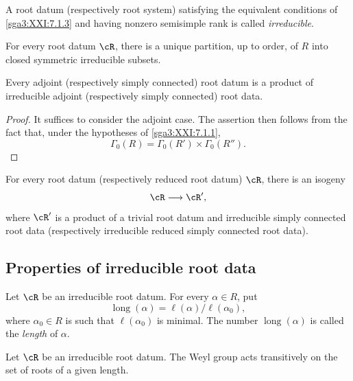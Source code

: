 \begin{definition}\label{sga3:XXI:7.1.4}
A root datum (respectively root system) satisfying the equivalent
conditions of \ref{sga3:XXI:7.1.3} and having nonzero semisimple
rank is called \emph{irreducible}.
\end{definition}

\begin{corollary}\label{sga3:XXI:7.1.5}
For every root datum \(\cR\), there is a unique partition, up to
order, of \(R\) into closed symmetric irreducible subsets.
\end{corollary}

\begin{corollary}\label{sga3:XXI:7.1.6}
Every adjoint (respectively simply connected) root datum is a
product of irreducible adjoint (respectively simply connected) root
data.
\end{corollary}

\begin{proof}
It suffices to consider the adjoint case. The assertion then follows
from the fact that, under the hypotheses of
\ref{sga3:XXI:7.1.1},
\[
 \Gamma_0(R)=\Gamma_0(R')\times\Gamma_0(R'').
\]
\end{proof}

\begin{corollary}\label{sga3:XXI:7.1.7}
For every root datum (respectively reduced root datum) \(\cR\),
there is an isogeny
\[
 \cR\longrightarrow\cR',
\]
where \(\cR'\) is a product of a trivial root datum and irreducible
simply connected root data (respectively irreducible reduced simply
connected root data).
\end{corollary}

\subsection{Properties of irreducible root data}
\label{sga3:XXI:7.2}

\begin{definition}\label{sga3:XXI:7.2.1}
Let \(\cR\) be an irreducible root datum. For every \(\alpha\in R\),
put
\[
 \operatorname{long}(\alpha)
 =\ell(\alpha)/\ell(\alpha_0),
\]
where \(\alpha_0\in R\) is such that \(\ell(\alpha_0)\) is minimal.
The number \(\operatorname{long}(\alpha)\) is called the
\emph{length} of \(\alpha\).
\end{definition}

\begin{lemma}\label{sga3:XXI:7.2.2}
Let \(\cR\) be an irreducible root datum. The Weyl group acts
transitively on the set of roots of a given length.
\end{lemma}

